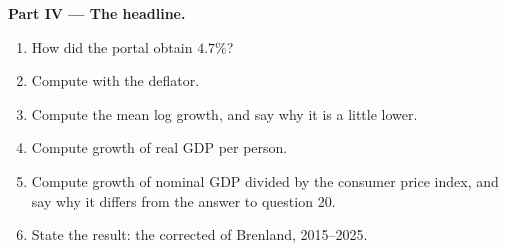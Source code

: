 \begin{problem}
\medskip\noindent\textbf{Part IV --- The headline.}
\begin{enumerate}[resume]
  \item How did the portal obtain $4.7\%$?
  \item Compute  with the deflator.
  \item Compute the mean log growth, and say why it is a little lower.
  \item Compute growth of real GDP per person.
  \item Compute growth of nominal GDP divided by the consumer price index,
    and say why it differs from the answer to question 20.
  \item State the result: the corrected  of Brenland, 2015--2025.
\end{enumerate}
\end{problem}
